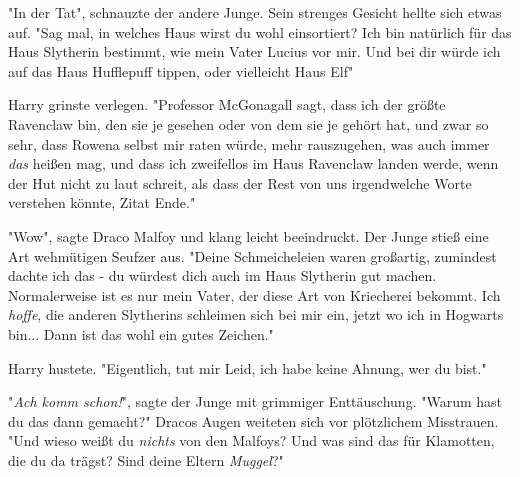 "In der Tat", schnauzte der andere Junge. Sein strenges Gesicht hellte sich etwas auf. "Sag mal, in welches Haus wirst du wohl einsortiert? Ich bin natürlich für das Haus Slytherin bestimmt, wie mein Vater Lucius vor mir. Und bei dir würde ich auf das Haus Hufflepuff tippen, oder vielleicht Haus Elf"

Harry grinste verlegen. "Professor McGonagall sagt, dass ich der größte Ravenclaw bin, den sie je gesehen oder von dem sie je gehört hat, und zwar so sehr, dass Rowena selbst mir raten würde, mehr rauszugehen, was auch immer \emph{das} heißen mag, und dass ich zweifellos im Haus Ravenclaw landen werde, wenn der Hut nicht zu laut schreit, als dass der Rest von uns irgendwelche Worte verstehen könnte, Zitat Ende." 

"Wow", sagte Draco Malfoy und klang leicht beeindruckt. Der Junge stieß eine Art wehmütigen Seufzer aus. "Deine Schmeicheleien waren großartig, zumindest dachte ich das - du würdest dich auch im Haus Slytherin gut machen. Normalerweise ist es nur mein Vater, der diese Art von Kriecherei bekommt. Ich \emph{hoffe}, die anderen Slytherins schleimen sich bei mir ein, jetzt wo ich in Hogwarts bin... Dann ist das wohl ein gutes Zeichen."

Harry hustete. "Eigentlich, tut mir Leid, ich habe keine Ahnung, wer du bist."

"\emph{Ach komm schon!}", sagte der Junge mit grimmiger Enttäuschung. "Warum hast du das dann gemacht?" Dracos Augen weiteten sich vor plötzlichem Misstrauen. "Und wieso weißt du \emph{nichts} von den Malfoys? Und was sind das für Klamotten, die du da trägst? Sind deine Eltern \emph{Muggel}?" 

